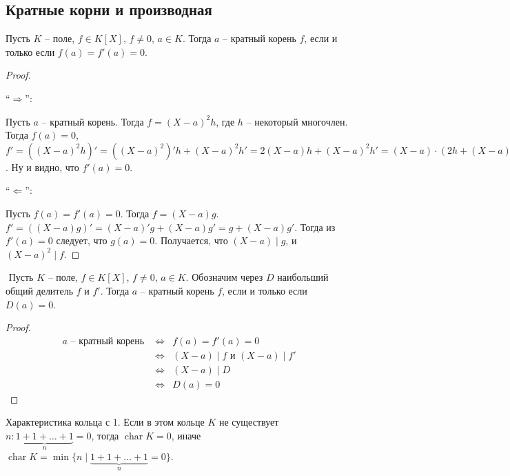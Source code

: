 \begin{normalsize}
\section{Кратные корни и производная}

\begin{theorem-non}
    Пусть $K$ -- поле, $f \in K[X]$, $f \neq 0$, $a \in K$.
    Тогда $a$ -- кратный корень $f$, если и только если 
    $f(a) = f'(a) = 0$.
\end{theorem-non}
\begin{proof} $ $

    ``$\Longrightarrow$'':

    Пусть $a$ -- кратный корень. Тогда $f = (X - a)^2 h$, где $h$ --
    некоторый многочлен. Тогда $f(a) = 0$, $f' = ((X - a)^2 h)' =
    ((X - a)^2)' h + (X - a)^2 h' = 2(X - a) h + (X - a)^2 h' = 
    (X - a) \cdot (2h + (X - a) h')$. Ну и видно, что $f'(a) = 0$.

    ``$\Longleftarrow$'':

    Пусть $f(a) = f'(a) = 0$. Тогда $f = (X - a)g$. $f' = ((X - a)g)' =
    (X - a)'g + (X - a)g' = g + (X - a)g'$. Тогда из $f'(a) = 0$
    следует, что $g(a) = 0$. Получается, что $(X - a) \mid g$, и
    $(X - a)^2 \mid f$. 
\end{proof}

\follow$ $
    Пусть $K$ -- поле, $f \in K[X]$, $f \neq 0$, $a \in K$. Обозначим
    через $D$ наибольший общий делитель $f$ и $f'$. Тогда $a$ --
    кратный корень $f$, если и только если $D(a) = 0$.

\begin{proof}
    \begin{eqnarray*}
        a \text{ -- кратный корень } &\Longleftrightarrow&
        f(a) = f'(a) = 0 \\
        &\Longleftrightarrow& (X - a) \mid f \text{ и } (X - a) \mid f' \\
        &\Longleftrightarrow& (X - a) \mid D \\
        &\Longleftrightarrow& D(a) = 0
    \end{eqnarray*}
\end{proof}

\begin{conj}
    Характеристика кольца с 1.
    Если в этом кольце $K$ не существует $n : \underbrace{1 + 1 + 
    \dots + 1}_n = 0$, тогда $\operatorname{char} K = 0$, иначе 
    $\operatorname{char} K = \min \{n \mid \underbrace{1 + 1 + \dots + 1
    }_n = 0\}$.
\end{conj}


\end{normalsize}
